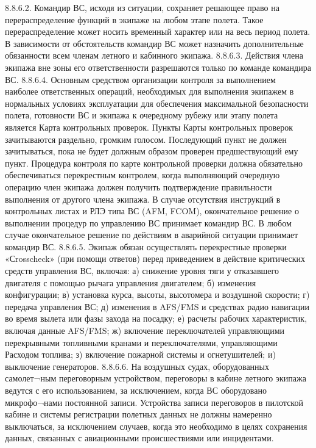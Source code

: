 8.8.6.2. Командир ВС, исходя из ситуации, сохраняет решающее право на перераспределение функций в экипаже на любом этапе полета. Такое перераспределение может носить временный характер или на весь период полета.
В зависимости от обстоятельств командир ВС может назначить дополнительные обязанности всем членам летного и кабинного экипажа. 
8.8.6.3. Действия члена экипажа вне зоны его ответственности разрешаются только по команде командира ВС.
8.8.6.4. Основным средством организации контроля за выполнением наиболее ответственных операций, необходимых для выполнения экипажем в нормальных условиях эксплуатации для обеспечения максимальной безопасности полета, готовности ВС и экипажа к очередному рубежу или этапу полета является Карта контрольных проверок.
Пункты Карты контрольных проверок зачитываются раздельно, громким голосом.
Последующий пункт не должен зачитываться, пока не будет должным образом проверен предшествующий ему пункт. 
Процедура контроля по карте контрольной проверки должна обязательно обеспечиваться перекрестным контролем, когда выполняющий очередную операцию член экипажа должен получить подтверждение правильности выполнения от другого члена экипажа.
В случае отсутствия инструкций в контрольных листах и РЛЭ типа ВС (AFM, FCOM), окончательное решение о выполнении процедур по управлению ВС принимает командир ВС.
В любом случае окончательное решение по действиям в аварийной ситуации принимает командир ВС.
8.8.6.5. Экипаж обязан осуществлять перекрестные проверки «Сrosscheck» (при помощи ответов) перед приведением в действие критических средств управления ВС, включая:
а)	снижение уровня тяги у отказавшего двигателя с помощью рычага управления двигателем;
б)	изменения конфигурации;
в)	установка курса, высоты, высотомера и воздушной скорости;
г)	передача управления ВС;
д)	изменения в AFS/FMS и средствах радио навигации во время вылета или фазы захода на посадку;
е)	расчеты рабочих характеристик, включая данные AFS/FMS;
ж)	включение переключателей управляющими перекрывными топливными кранами и переключателями, управляющими Расходом топлива;
з)	включение пожарной системы и огнетушителей;
и)	выключение генераторов.
8.8.6.6. На воздушных судах, оборудованных самолет¬ным переговорным устройством, переговоры в кабине летного экипажа ведутся с его использованием, за исключением, когда ВС оборудовано микрофо¬нами постоянной записи. Устройства записи переговоров в пилотской кабине и системы регистрации полетных данных не должны намеренно выключаться, за исключением случаев, когда это необходимо в целях сохранения данных, связанных с авиационными происшествиями или инцидентами.
